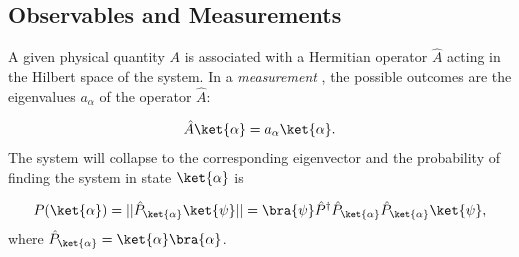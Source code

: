\subsection{Observables and Measurements}A given physical quantity $A$ is associated with a Hermitian operator $\hat{A}$  acting in the Hilbert space  of the system.
In a \emph{measurement} , the possible outcomes are the eigenvalues $a_\alpha$  of the operator $\hat{A}$:

\begin{align}
				\hat{A}\ket{\alpha}=a_{\alpha}\ket{\alpha}.
			
\end{align}
The system will collapse to the corresponding eigenvector  and the probability of finding the system in state $\ket{\alpha}$ is

\begin{align}
	P(\ket{\alpha})=||\hat{P}_{\ket{\alpha}} \ket{\psi}|| = \bra{\psi} \hat{P}^{\dag}\hat{P}_{\ket{\alpha}} \hat{P}_{\ket{\alpha}} \ket{\psi},
\end{align}
where $\hat{P}_{\ket{\alpha}}= \ket{\alpha} \bra{\alpha}$.
